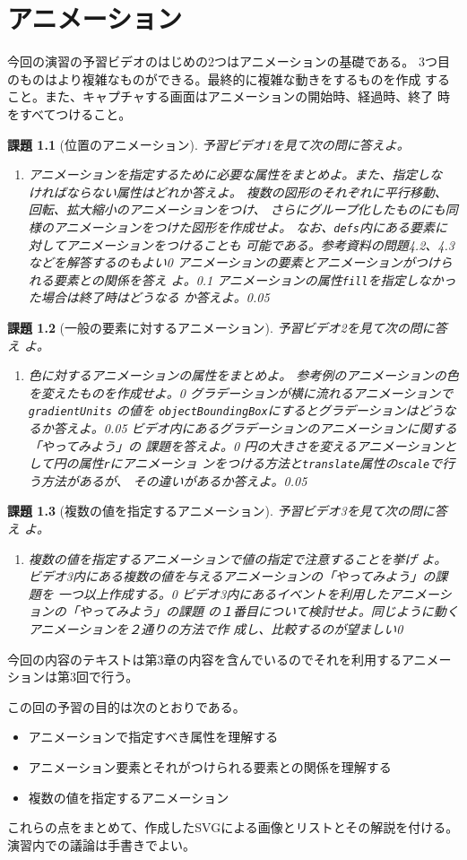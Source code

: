 \documentclass[a4j]{jreport}
\newtheorem{Report}{課題}
\newcommand{\Probs}[3]{%
 \begin{Report}[#1]\upshape
  #2
  \begin{enumerate}\upshape
  \ShowProbs#3\relax\relax
  \end{enumerate}
 \end{Report}
 }
\newcommand{\ShowProbs}[2]{\ifx#1\relax\else%
 \item #1\vspace{#2\textheight}\expandafter\ShowProbs\fi}
\newcommand{\changePage}[1]{
 \renewcommand{\thepage}{第\thechapter 回(#1)-\arabic{page}}
  \setcounter{page}{1}
}
\begin{document}
\chapter{アニメーション}
\changePage{4/25}
今回の演習の予習ビデオのはじめの2つはアニメーションの基礎である。
3つ目のものはより複雑なものができる。最終的に複雑な動きをするものを作成
すること。また、キャプチャする画面はアニメーションの開始時、経過時、終了
時をすべてつけること。
\Probs{位置のアニメーション}{予習ビデオ1を見て次の問に答えよ。}{
{アニメーションを指定するために必要な属性をまとめよ。また、指定しな
ければならない属性はどれか答えよ。}{0}
{複数の図形のそれぞれに平行移動、回転、拡大縮小のアニメーションをつけ、
さらにグループ化したものにも同様のアニメーションをつけた図形を作成せよ。
なお、\texttt{defs}内にある要素に対してアニメーションをつけることも
可能である。参考資料の問題4.2、4.3などを解答するのもよい}{0}
{アニメーションの要素とアニメーションがつけられる要素との関係を答え
よ。}{0.1}
{アニメーションの属性\texttt{fill}を指定しなかった場合は終了時はどうなる
か答えよ。}{0.05}}
\Probs{一般の要素に対するアニメーション}{予習ビデオ2を見て次の問に答え
よ。}{
{色に対するアニメーションの属性をまとめよ。}{0}
{参考例のアニメーションの色を変えたものを作成せよ。}{0}
{グラデーションが横に流れるアニメーションで\texttt{gradientUnits} の値を
\texttt{objectBoundingBox}にするとグラデーションはどうなるか答えよ。}{0.05}
{ビデオ内にあるグラデーションのアニメーションに関する「やってみよう」の
課題を答えよ。}{0}
{円の大きさを変えるアニメーションとして円の属性\texttt{r}にアニメーショ
ンをつける方法と\texttt{translate}属性の\texttt{scale}で行う方法があるが、
その違いがあるか答えよ。}{0.05}
}
\Probs{複数の値を指定するアニメーション}{予習ビデオ3を見て次の問に答え
よ。}{{複数の値を指定するアニメーションで値の指定で注意することを挙げ
よ。}{0.05}
{ビデオ3内にある複数の値を与えるアニメーションの「やってみよう」の課題を
一つ以上作成する。}{0}
{ビデオ3内にあるイベントを利用したアニメーションの「やってみよう」の課題
の１番目について検討せよ。同じように動くアニメーションを２通りの方法で作
成し、比較するのが望ましい}{0}
}
{今回の内容のテキストは第3章の内容を含んでいるのでそれを利用するアニメー
ションは第3回で行う。\par
この回の予習の目的は次のとおりである。
\begin{itemize}
 \item アニメーションで指定すべき属性を理解する
 \item アニメーション要素とそれがつけられる要素との関係を理解する
 \item 複数の値を指定するアニメーション
\end{itemize}
これらの点をまとめて、作成したSVGによる画像とリストとその解説を付ける。
演習内での議論は手書きでよい。}
\end{document}
